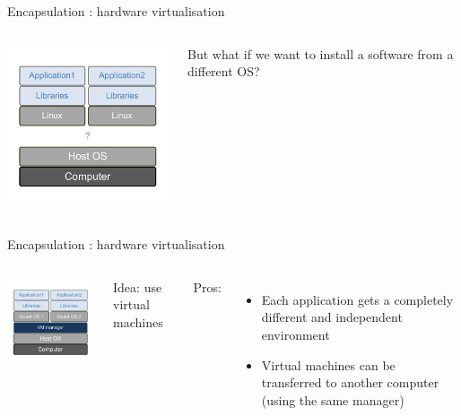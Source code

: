 \begin{frame}{Encapsulation : hardware virtualisation}
\begin{columns}

\includegraphics[width=6cm]{02_encapsulation/figures/intro_encapsulation_v2-7.pdf}

But what if we want to install a software from a different OS?

\end{columns}
\end{frame}

\begin{frame}{Encapsulation : hardware virtualisation}
\begin{columns}

\includegraphics[width=6cm]{02_encapsulation/figures/intro_encapsulation_v2-8.pdf}

Idea: use virtual machines

Pros: 
\begin{itemize}
  \item Each application gets a completely different and independent environment
  \item Virtual machines can be transferred to another computer (using the same manager)
\end{itemize}

\end{columns}
\end{frame}

